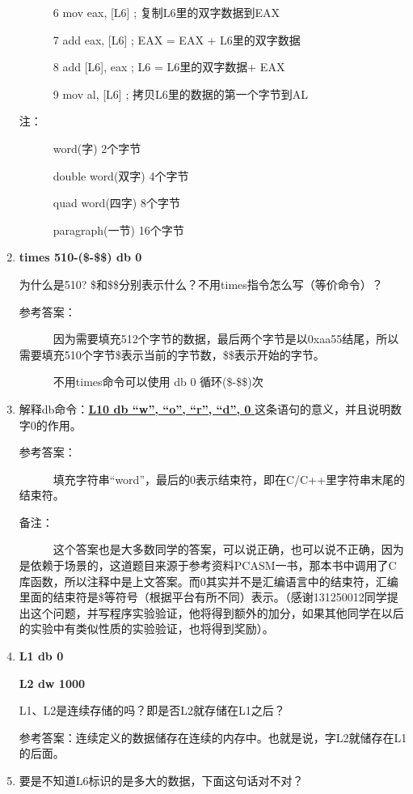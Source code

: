 \documentclass[a4paper]{article}
\begin{document}
\begin{enumerate}
~~~~~~6 mov eax, [L6] ; 复制L6里的双字数据到EAX

~~~~~~7 add eax, [L6] ; EAX = EAX + L6里的双字数据

~~~~~~8 add [L6], eax ; L6 = L6里的双字数据+ EAX

~~~~~~9 mov al, [L6] ; 拷贝L6里的数据的第一个字节到AL

注：

~~~~~~word(字) 2个字节

~~~~~~double word(双字) 4个字节

~~~~~~quad word(四字) 8个字节

~~~~~~paragraph(一节) 16个字节
		
	\item \textbf{times 510-(\$-\$\$) db 0}
		
		为什么是510? \$和\$\$分别表示什么？不用times指令怎么写（等价命令）？
		
		参考答案：
		
		~~~~~~因为需要填充512个字节的数据，最后两个字节是以0xaa55结尾，所以需要填充510个字节\$表示当前的字节数，\$\$表示开始的字节。
		
~~~~~~不用times命令可以使用 db 0 循环(\$-\$\$)次
		
	\item 解释db命令：\underline{\textbf{L10 db “w”, “o”, “r”, “d”, 0  }}这条语句的意义，并且说明数字0的作用。
	
	参考答案：
	
	~~~~~~填充字符串“word”，最后的0表示结束符，即在C/C++里字符串末尾的结束符。
	
	备注：
	
	~~~~~~这个答案也是大多数同学的答案，可以说正确，也可以说不正确，因为是依赖于场景的，这道题目来源于参考资料PCASM一书，那本书中调用了C库函数，所以注释中是上文答案。而0其实并不是汇编语言中的结束符，汇编里面的结束符是\$等符号（根据平台有所不同）表示。（感谢131250012同学提出这个问题，并写程序实验验证，他将得到额外的加分，如果其他同学在以后的实验中有类似性质的实验验证，也将得到奖励）。
	
	\item \textbf{L1 db 0}
		
		\textbf{L2 dw 1000}
		
		L1、L2是连续存储的吗？即是否L2就存储在L1之后？
		
		参考答案：连续定义的数据储存在连续的内存中。也就是说，字L2就储存在L1的后面。
		
				
	\item 要是不知道L6标识的是多大的数据，下面这句话对不对？
		

\end{enumerate}
\end{document}
